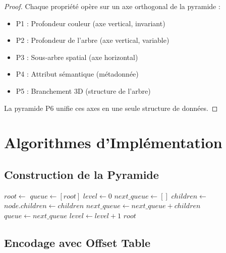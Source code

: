 \documentclass[12pt,a4paper]{article}
\theoremstyle{definition}
\begin{document}
	\begin{proof}
		Chaque propriété opère sur un axe orthogonal de la pyramide :
		\begin{itemize}
			\item P1 : Profondeur couleur (axe vertical, invariant)
			\item P2 : Profondeur de l'arbre (axe vertical, variable)
			\item P3 : Sous-arbre spatial (axe horizontal)
			\item P4 : Attribut sémantique (métadonnée)
			\item P5 : Branchement 3D (structure de l'arbre)
		\end{itemize}
		La pyramide P6 unifie ces axes en une seule structure de données.
	\end{proof}
	
	\section{Algorithmes d'Implémentation}
	
	\subsection{Construction de la Pyramide}
	
	\begin{algorithm}[h]
		\caption{Construction Pyramidale}
		\label{algo:construction_pyramide}
		\begin{algorithmic}[1]
			\State $root \gets$  
			\State $queue \gets [root]$
			\State $level \gets 0$
			\State $next\_queue \gets []$
			\State $children \gets$ 
			\State $node.children \gets children$
			\State $next\_queue \gets next\_queue + children$
			\EndFor
			\State $queue \gets next\_queue$
			\State $level \gets level + 1$
			\EndWhile
			\State \Return $root$
			\EndProcedure
		\end{algorithmic}
	\end{algorithm}
	
	\subsection{Encodage avec Offset Table}
	
\end{document}
